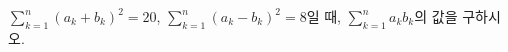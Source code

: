 $\displaystyle\sum_{k=1}^{n} (a_k+b_k)^2=20$, $\displaystyle\sum_{k=1}^{n} (a_k-b_k)^2=8$일 때, $\displaystyle\sum_{k=1}^{n} a_kb_k$의 값을 구하시오.
